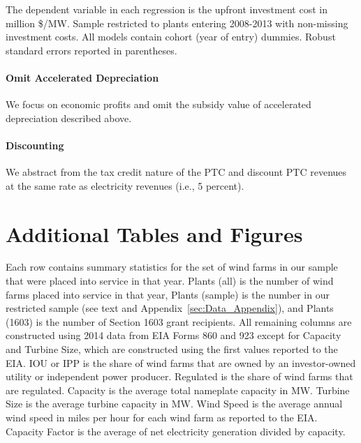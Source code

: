\documentclass[12pt]{article}
\begin{document}
\begin{table}[H]
\caption{Fixed Cost Estimation \label{tab:cost_prediction}}
\begin{center}

\end{center}
\footnotesize
The dependent variable in each regression is the upfront investment cost in million \$/MW. Sample restricted to plants entering 2008-2013 with non-missing investment costs. All models contain cohort (year of entry) dummies. Robust standard errors reported in parentheses.
\end{table}

\paragraph*{Omit Accelerated Depreciation}
We focus on economic profits and omit the subsidy value of accelerated depreciation described above.

\paragraph*{Discounting}
We abstract from the tax credit nature of the PTC and discount PTC revenues at the same rate as electricity revenues (i.e., 5 percent).


\clearpage
\section{Additional Tables and Figures}

\begin{table}[H]
\caption{Summary Statistics by Entry Date \label{tab:Summary-Statistics}}
\vspace{-15pt}

\footnotesize
Each row contains summary statistics for the set of wind farms in our sample that were placed into service in that year. Plants (all) is the number of wind farms placed into service in that year, Plants (sample) is the number in our restricted sample (see text and Appendix~\ref{sec:Data_Appendix}), and Plants (1603) is the number of Section 1603 grant recipients. All remaining columns are constructed using 2014 data from EIA Forms 860 and 923 except for Capacity and Turbine Size, which are constructed using the first values reported to the EIA. IOU or IPP is the share of wind farms that are owned by an investor-owned utility or independent power producer. Regulated is the share of wind farms that are regulated. Capacity is the average total nameplate capacity in MW. Turbine Size is the average turbine capacity in MW. Wind Speed is the average annual wind speed in miles per hour for each wind farm as reported to the EIA. Capacity Factor is the average of net electricity generation divided by capacity.
\end{table}
\end{document}
